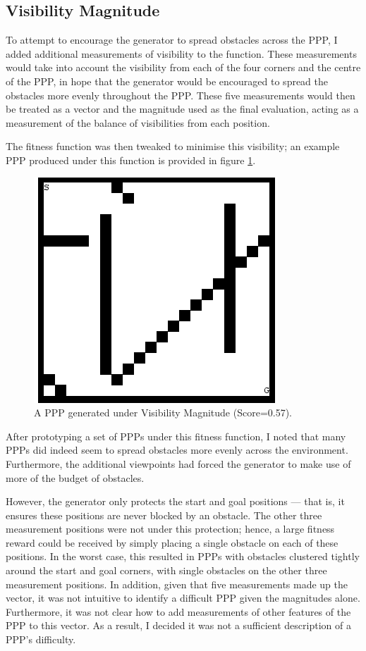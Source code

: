 \documentclass[authoryearcitations]{UoYCSproject}
\begin{document}
\subsection{Visibility Magnitude}
\label{sec:visMag}
To attempt to encourage the generator to spread obstacles across the PPP, I added additional measurements of visibility to the function. These measurements would take into account the visibility from each of the four corners and the centre of the PPP, in hope that the generator would be encouraged to spread the obstacles more evenly throughout the PPP. These five measurements would then be treated as a vector and the magnitude used as the final evaluation, acting as a measurement of the balance of visibilities from each position.

The fitness function was then tweaked to minimise this visibility; an example PPP produced under this function is provided in figure \ref{fig:vis_mag_ppp}.

\begin{figure}
\graphicspath{ {DesignImpPics/} }
\includegraphics[scale=0.65]{visMag.png}
\caption{A PPP generated under Visibility Magnitude (Score=0.57).}
\label{fig:vis_mag_ppp}
\end{figure}

After prototyping a set of PPPs under this fitness function, I noted that many PPPs did indeed seem to spread obstacles more evenly across the environment. Furthermore, the additional viewpoints had forced the generator to make use of more of the budget of obstacles. 

However, the generator only protects the start and goal positions --- that is, it ensures these positions are never blocked by an obstacle. The other three measurement positions were not under this protection; hence, a large fitness reward could be received by simply placing a single obstacle on each of these positions. In the worst case, this resulted in PPPs with obstacles clustered tightly around the start and goal corners, with single obstacles on the other three measurement positions. In addition, given that five measurements made up the vector, it was not intuitive to identify a difficult PPP given the magnitudes alone. Furthermore, it was not clear how to add measurements of other features of the PPP to this vector. As a result, I decided it was not a sufficient description of a PPP's difficulty.
\end{document}
